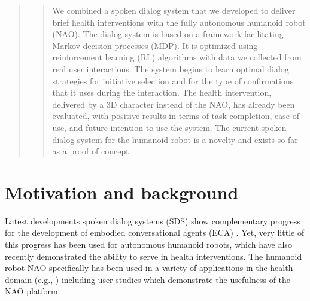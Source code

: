 \documentclass[letterpaper]{article}
\begin{document}
\maketitle
\begin{abstract}
\begin{quote}
We combined a spoken dialog system that we developed to deliver brief health interventions with the fully autonomous humanoid robot (NAO).
The dialog system is based on a framework facilitating Markov decision processes (MDP). It is optimized using reinforcement learning (RL) algorithms with data we collected from real user interactions. The system begins to learn optimal dialog strategies for initiative selection and for the type of confirmations that it uses during the
interaction. 
The health intervention, delivered by a 3D character instead of the NAO, has already been evaluated, with positive results in terms of task completion, ease of use, and future intention to use the system.  The current spoken dialog system for the humanoid robot is a novelty and exists so far as a proof of
concept.%
\end{quote} 
\end{abstract}


\section{Motivation and background} \label{intro}

Latest developments spoken dialog systems (SDS) show complementary progress for the development of  embodied conversational agents (ECA) \cite{YASCLL14}. Yet, very little of
this progress has been used for autonomous humanoid robots, which have also recently demonstrated the ability
to serve in health interventions. The
humanoid robot NAO specifically has been used in a variety of applications in the health domain (e.g.,
\cite{MAJA13}) including user studies which demonstrate the usefulness of the NAO platform.
\end{document}
